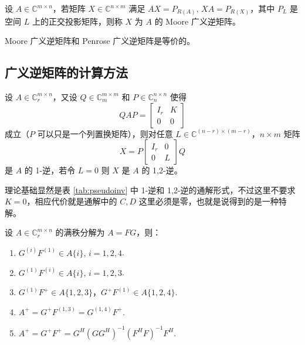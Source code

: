 \begin{definition}[广义逆的等价定义]
设 $A\in\mathbb C^{m\times n}$，若矩阵 $X\in\mathbb C^{n\times m}$ 满足 $AX=P_{R(A)},\,XA=P_{R(X)}$，其中 $P_L$ 是空间 $L$ 上的正交投影矩阵，则称 $X$ 为 $A$ 的 Moore 广义逆矩阵。
\end{definition}

\begin{theorem}
Moore 广义逆矩阵和 Penrose 广义逆矩阵是等价的。
\end{theorem}


\subsection{广义逆矩阵的计算方法}

\begin{theorem}
设 $A\in\mathbb C_r^{m\times n}$，又设 $Q\in\mathbb C_m^{m\times m}$ 和 $P\in\mathbb C_n^{n\times n}$ 使得
\[
    QAP=\begin{bmatrix}I_r&K\\0&0\end{bmatrix}
\]
成立（$P$ 可以只是一个列置换矩阵），则对任意 $L\in\mathbb C^{(n-r)\times (m-r)}$，$n\times m$ 矩阵
\[
    X=P\begin{bmatrix}I_r&0\\0&L\end{bmatrix}Q
\]
是 $A$ 的 1-逆，若令 $L=0$ 则 $X$ 是 $A$ 的 1,2-逆。
\end{theorem}

\begin{remark}
理论基础显然是表 \ref{tab:pseudoinv} 中 1-逆和 1,2-逆的通解形式，不过这里不要求 $K=0$，相应代价就是通解中的 $C,D$ 这里必须是零，也就是说得到的是一种特解。
\end{remark}

\begin{theorem}[满秩分解求广义逆矩阵]
设 $A\in\mathbb C_r^{m\times n}$ 的满秩分解为 $A=FG$，则：
\begin{enumerate}
    \item $G^{(i)}F^{(1)}\in A\{i\},\,i=1,2,4$.
    \item $G^{(1)}F^{(i)}\in A\{i\},\,i=1,2,3$.
    \item $G^{(1)}F^{+}\in A\{1,2,3\}$，$G^{+}F^{(1)}\in A\{1,2,4\}$.
    \item $A^+=G^+F^{(1,3)}=G^{(1,4)}F^+$.
    \item $A^+=G^+F^+=G^H(GG^H)^{-1}(F^HF)^{-1}F^H$.
\end{enumerate}
\end{theorem}

